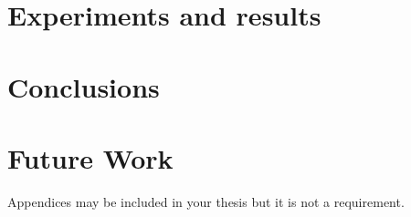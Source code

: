 \documentclass[a4paper]{article}
\begin{document}

\newpage




\newpage

\newpage

\newpage


\newpage


\newpage



\clearpage




\clearpage



\newpage

\clearpage
\section{Experiments and results}
\label{sec:tests}
\lipsum[9]

\clearpage


\clearpage


\clearpage
\section{Conclusions}
\label{sec:conclusions}

\lipsum[4]

\lipsum[3]

\section{Future Work}
\label{sec:futwork}

\lipsum[10]

\newpage

\medskip

%
%

\clearpage
\newpage
\begin{appendices}

{Appendices may be included in your thesis but it is not a requirement.}

\end{appendices}
\end{document}
